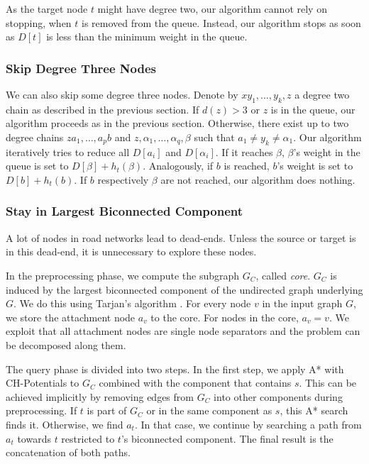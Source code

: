 \documentclass[manuscript,review]{acmart}
\begin{document}
As the target node $t$ might have degree two, our algorithm cannot rely on stopping, when $t$ is removed from the queue.
Instead, our algorithm stops as soon as $D[t]$ is less than the minimum weight in the queue.

\subsubsection{Skip Degree Three Nodes}

We can also skip some degree three nodes.
Denote by $x y_1,\ldots, y_k, z$ a degree two chain as described in the previous section.
If $d(z) > 3$ or $z$ is in the queue, our algorithm proceeds as in the previous section.
Otherwise, there exist up to two degree chains $z a_1,\ldots,a_p b$ and $z,\alpha_1,\ldots,\alpha_q,\beta$ such that $a_1\neq y_k \neq \alpha_1$.
Our algorithm iteratively tries to reduce all $D[a_i]$ and $D[\alpha_i]$.
If it reaches $\beta$, $\beta$'s weight in the queue is set to $D[\beta]+h_t(\beta)$.
Analogously, if $b$ is reached, $b$'s weight is set to $D[b]+h_t(b)$.
If $b$ respectively $\beta$ are not reached, our algorithm does nothing.

\subsubsection{Stay in Largest Biconnected Component}\label{sec:largested-biconnected-component}

A lot of nodes in road networks lead to dead-ends.
Unless the source or target is in this dead-end, it is unnecessary to explore these nodes.

In the preprocessing phase, we compute the subgraph $G_C$, called \emph{core}.
$G_C$ is induced by the largest biconnected component of the undirected graph underlying $G$.
We do this using Tarjan's algorithm \cite{t-dfslg2-72}.
For every node $v$ in the input graph $G$, we store the attachment node $a_v$ to the core.
For nodes in the core, $a_v=v$.
We exploit that all attachment nodes are single node separators and the problem can be decomposed along them.

The query phase is divided into two steps.
In the first step, we apply A* with CH-Potentials to $G_C$ combined with the component that contains $s$.
This can be achieved implicitly by removing edges from $G_C$ into other components during preprocessing.
If $t$ is part of $G_C$ or in the same component as $s$, this A* search finds it.
Otherwise, we find $a_t$.
In that case, we continue by searching a path from $a_t$ towards $t$ restricted to $t$'s biconnected component.
The final result is the concatenation of both paths.
\end{document}
